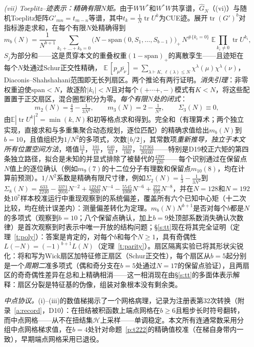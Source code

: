 \documentclass[11pt]{article}
\numberwithin{equation}{section}
\theoremstyle{definition}
\theoremstyle{remark}
\begin{document}
\emph{(vii) Toeplitz--迹表示：精确有限$N$矩。}由于$WW^{*}$和$W^{*}W$共享谱，$\widehat G_N$（(vi)）与随机Toeplitz矩阵$G'_{mn}=t_{m-n}$等谱，其中$t_k=\frac1N\operatorname{tr}U^{k}$为CUE迹。展开$\operatorname{tr}(G')^{b}$对指标游走求和，在每个有限$N$处精确得到
\[
m_b(N)
=\frac1{N^{b+1}}\!\!\sum_{k_1+\dots+k_b=0}\!\!
\bigl(N-\mathrm{span}(0,S_1,\dots,S_{b-1})\bigr)_{+}\,
N^{\#\{k_i=0\}}\;
\mathbb E\!\!\prod_{k_i\neq0}\!\operatorname{tr}U^{k_i},
\]
$S_j$为部分和——这是贯穿本文的重叠权重$(1-\mathrm{span})_+$的离散孪生——且迹矩在每个$N$处通过Schur正交性精确，
$\mathbb E\,[p_\mu\overline{p_\nu}]
=\sum_{\lambda\vdash K,\,\ell(\lambda)\le N}
\chi^{\lambda}(\mu)\chi^{\lambda}(\nu)$，Diaconis--Shahshahani范围即无长列扇区。两个推论有两行证明。\emph{消失引理}：非零权重迫使$\mathrm{span}<N$，故逐阶$|k_i|<N$且对每个$(+\cdots+,-)$模式有$K<N$，将这些配置置于正交扇区，混合圈型积分为零。\emph{每个有限$N$处的闭式}：
\[
m_2(N)=\tfrac43-\tfrac1{3N^{2}},\qquad
m_3(N)=2-\tfrac1{N^{2}},\qquad
\Sigma_3(N)\equiv0,
\]
由$\mathbb E|\operatorname{tr}U^{k}|^{2}=\min(k,N)$和初等格点求和得到。完全和（有理算术；两个独立实现，直接求和与多重集聚合动态规划，逐位匹配）的精确求值给出$m_b(N)$到$b=10$，且值组织为$1/N^{2}$的多项式，次数$\lfloor b/2\rfloor$，其常数项\emph{重新推导，独立于本文所有位置空间方法}，塔值$\tfrac{13}4$，$\tfrac{101}{18}$，$\tfrac{640}{63}$，$\tfrac{3439}{180}$，$\tfrac{747361}{20160}$——特别是D19校正六矩的第四条独立路径，拟合是未知的并显式排除了被替代的$\tfrac{4297}{420}$——每个识别通过在保留点$N$值上的逐位确认（例如$m_9(7)$的十二位分子有理数和保留点$m_{10}(8)$，均在计算前预测）。$1/N^{2}$系数是精确有限尺寸律，例如$\Sigma_2(N)=\tfrac13-\tfrac1{3N^{2}}$到$\Sigma_8(N)=\tfrac{633}{2240}-\tfrac{3371}{2016}N^{-2}
+\tfrac{12247}{2880}N^{-4}-\tfrac{5545}{1008}N^{-6}
+\tfrac{277}{105}N^{-8}$，并在$N=128$和$N=192$处$10^{7}$样本校准运行中重现观察到的系统偏差，覆盖所有六个已知中心矩（十二次比较，均在统计误差内）：测量偏差转化为定理。$m_b(N)N^{b+1}$是否对每个$b$都是$N$的多项式（观察到$b=10$；八个保留点确认，加上$b=9$处顶部系数消失确认次数律）是首次观察到时表示中唯一开放的结构问题；\S\ref{s:tt}现在将其完全证明（定理~\ref{t:poly}）：答案是肯定的，对每个$b$和每个$N\ge1$，具有奇偶性$L(-N)=(-1)^{b+1}L(N)$（定理~\ref{t:parity}）。扇区隔离实验已将其形状尖锐化：将和写为Wick扇区加特征修正扇区（Schur正交性），每个扇区从$b=5$起分别是一个\emph{周期二}准多项式（偶和奇分支在$b=5$处通过$N=17$的保留点验证），且两扇区的奇奇偶性差异在总和上精确相消——这一相消现在由\S\ref{s:tt}的多面体表示解释：扇区分裂是特征基的伪像，组装对象根本没有剩余类。

\emph{中点协议。}(i)--(iii)的数值梯揭示了一个网格病理，记录为注册表第32次转换（附录~\ref{a:record}，D10）：在扭结被积函数上端点网格在$b\ge6$且粗步长时符号翻转，而中点网格——从不在扭结集$\mathcal H$上采样——单调稳定。本文所有连通常数采用分组中点网格梯求值，在$b=4$处针对命题~\ref{p:t222}的精确值校准（在梯自身带内一致），早期端点网格采用已退役。
\end{document}
